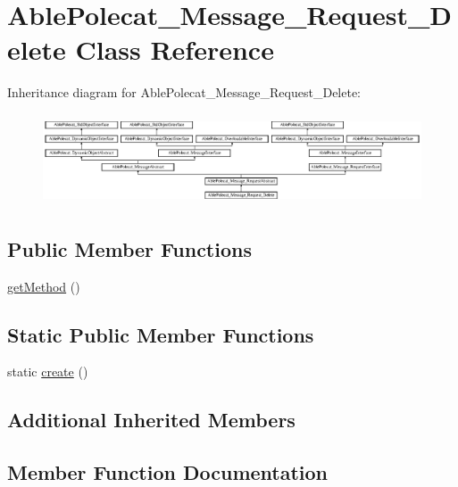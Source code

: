 \hypertarget{class_able_polecat___message___request___delete}{}\section{Able\+Polecat\+\_\+\+Message\+\_\+\+Request\+\_\+\+Delete Class Reference}
\label{class_able_polecat___message___request___delete}
Inheritance diagram for Able\+Polecat\+\_\+\+Message\+\_\+\+Request\+\_\+\+Delete\+:\begin{figure}[H]
\begin{center}
\leavevmode
\includegraphics[height=2.720648cm]{class_able_polecat___message___request___delete}
\end{center}
\end{figure}
\subsection*{Public Member Functions}
\begin{DoxyCompactItemize}
\item 
\hyperlink{class_able_polecat___message___request___delete_af3e37e1a6ed9b8c87f86f659873a83b7}{get\+Method} ()
\end{DoxyCompactItemize}
\subsection*{Static Public Member Functions}
\begin{DoxyCompactItemize}
\item 
static \hyperlink{class_able_polecat___message___request___delete_a239b1c70258014a86569483c2d009de6}{create} ()
\end{DoxyCompactItemize}
\subsection*{Additional Inherited Members}


\subsection{Member Function Documentation}
\hypertarget{class_able_polecat___message___request___delete_a239b1c70258014a86569483c2d009de6}{}
